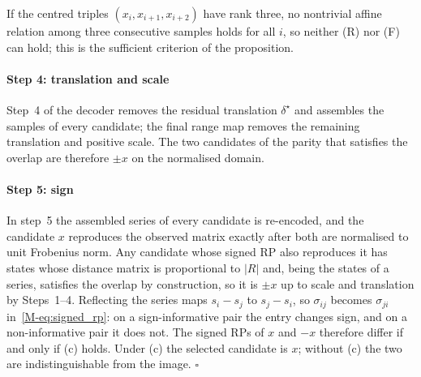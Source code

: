 \documentclass[preprint,12pt]{elsarticle}
\begin{document}
If the centred triples $(x_i,x_{i+1},x_{i+2})$ have rank three, no nontrivial affine relation among three consecutive samples holds for all $i$, so neither (R) nor (F) can hold; this is the sufficient criterion of the proposition.

\paragraph{Step 4: translation and scale}
Step~4 of the decoder removes the residual translation $\delta^\star$ and assembles the samples of every candidate; the final range map removes the remaining translation and positive scale. The two candidates of the parity that satisfies the overlap are therefore $\pm x$ on the normalised domain.

\paragraph{Step 5: sign}
In step~5 the assembled series of every candidate is re-encoded, and the candidate $x$ reproduces the observed matrix exactly after both are normalised to unit Frobenius norm. Any candidate whose signed RP also reproduces it has states whose distance matrix is proportional to $|R|$ and, being the states of a series, satisfies the overlap by construction, so it is $\pm x$ up to scale and translation by Steps~1--4. Reflecting the series maps $s_i-s_j$ to $s_j-s_i$, so $\sigma_{ij}$ becomes $\sigma_{ji}$ in~\eqref{M-eq:signed_rp}: on a sign-informative pair the entry changes sign, and on a non-informative pair it does not. The signed RPs of $x$ and $-x$ therefore differ if and only if (c) holds. Under (c) the selected candidate is $x$; without (c) the two are indistinguishable from the image. $\square$
\end{document}
